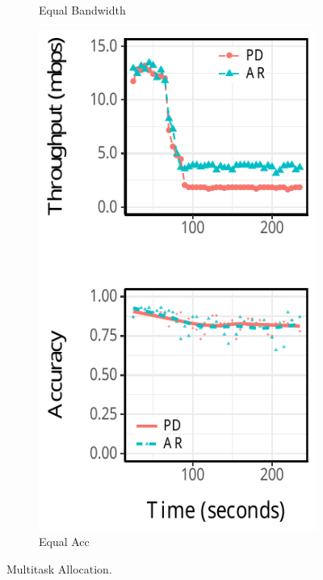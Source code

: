 \begin{figure}
\begin{subfigure}[t]{0.49\columnwidth}
    \caption{Equal Bandwidth}
    \label{fig:eq-bw}
  \end{subfigure}
  \hfill
  \begin{subfigure}[t]{0.49\columnwidth}
    \centering
    \includegraphics[width=\textwidth]{figures/multitask-eq-acc.pdf}
    \caption{Equal Acc}
    \label{fig:eq-acc}
  \end{subfigure}
  \caption{Multitask Allocation.}
  \label{fig:multitask}
\end{figure}

\newpage

